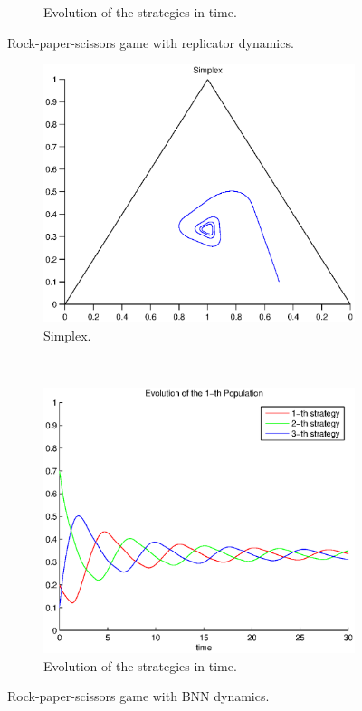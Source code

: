 \documentclass[a4paper,10pt]{article}
\begin{document}
\begin{figure}
\begin{subfigure}[b]{0.45\textwidth}
	  \caption{Evolution of the strategies in time.}
	  \label{fig:test1_ev_rd}
  \end{subfigure}
  \caption{Rock-paper-scissors game with replicator dynamics.}
  \label{fig:rpc_game_rd}
\end{figure}


\begin{figure}
  \centering
  \begin{subfigure}[b]{0.45\textwidth}
	  \includegraphics[width=\textwidth]{./images/test1_simplex_bnn.eps}
	  \caption{Simplex.}
	  \label{fig:test1_simplex_bnn}
  \end{subfigure}
  ~ 
  \begin{subfigure}[b]{0.45\textwidth}
	  \includegraphics[width=\textwidth]{./images/test1_ev_bnn.eps}
	  \caption{Evolution of the strategies in time.}
	  \label{fig:test1_ev_bnn}
  \end{subfigure}
  \caption{Rock-paper-scissors game with BNN dynamics.}
  \label{fig:rpc_game_bnn}
\end{figure}
\end{document}
